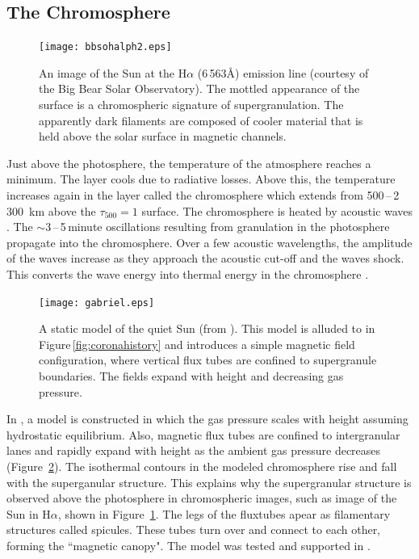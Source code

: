 \subsection{The Chromosphere}\label{sect:chroma}

\begin{figure}[!t]
\centerline{\texttt{[image: bbsohalph2.eps]}}
\caption[An image of the Sun at the H$\alpha$ absorption line.]{An image of the Sun at the H$\alpha$ (6\,563\AA) emission line (courtesy of the Big Bear Solar Observatory). The mottled appearance of the surface is a chromospheric signature of supergranulation. The apparently dark filaments are composed of cooler material that is held above the solar surface in magnetic channels.}
\label{fig:chromfd}
\end{figure}

Just above the photosphere, the temperature of the atmosphere reaches a minimum. The layer cools due to radiative losses. Above this, the temperature increases again in the layer called the chromosphere which extends from 500\,--\,2\,300~km above the $\tau_{500}=1$ surface. The chromosphere is heated by acoustic waves \citep{Schatzman:1949}. The $\sim$3\,--\,5\,minute oscillations resulting from granulation in the photosphere propagate into the chromosphere. Over a few acoustic wavelengths, the amplitude of the waves increase as they approach the acoustic cut-off and the waves shock. This converts the wave energy into thermal energy in the chromosphere \citep{Aschwanden:2005}.

\begin{figure}[!t]
\centerline{\texttt{[image: gabriel.eps]}} %
\caption[A static model of the quiet Sun.]{A static model of the quiet Sun (from \citet{Gabriel:1976}). This model is alluded to in Figure\,\ref{fig:coronahistory} and introduces a simple magnetic field configuration, where vertical flux tubes are confined to supergranule boundaries. The fields expand with height and decreasing gas pressure.}
\label{fig:gabmodel}
\end{figure}

In \cite{Gabriel:1976}, a model is constructed in which the gas pressure scales with height assuming hydrostatic equilibrium. Also, magnetic flux tubes are confined to intergranular lanes and rapidly expand with height as the ambient gas pressure decreases (Figure~\ref{fig:gabmodel}). The isothermal contours in the modeled chromosphere rise and fall with the superganular structure. This explains why the supergranular structure is observed above the photosphere in chromospheric images, such as image of the Sun in H$\alpha$, shown in Figure~\ref{fig:chromfd}. The legs of the \glspl{fluxtube} apear as filamentary structures called spicules. These tubes turn over and connect to each other, forming the ``magnetic canopy". The model was tested and supported in \cite{Gallagher:1998}.

